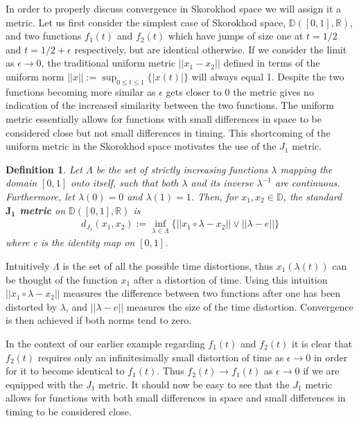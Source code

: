 \documentclass[honours,12pt]{unswthesis}
\newcommand{\R}{\mathbb{R}}
\newcommand{\1}{\mathbf 1}
\newcommand{\D}{\mathbb{D}}
\newtheorem{definition}[equation]{Definition}
\numberwithin{equation}{section}
\theoremstyle{definition}
\theoremstyle{remark}
\begin{document}
\noindent In order to properly discuss convergence in Skorokhod space we will assign it a metric. Let us first consider the simplest case of Skorokhod space, $\D([0,1],\R)$, and two functions $f_1(t)$ and $f_2(t)$ which have jumps of size one at $t=1/2$ and $t=1/2+\epsilon$ respectively, but are identical otherwise. If we consider the limit as $\epsilon\to0$, the traditional uniform metric $||x_1-x_2||$ defined in terms of the uniform norm $||x||:=\sup_{0\leq t\leq1}\{|x(t)|\}$ will always equal 1. Despite the two functions becoming more similar as $\epsilon$ gets closer to 0 the metric gives no indication of the increased similarity between the two functions. The uniform metric essentially allows for functions with small differences in space to be considered close but not small differences in timing. This shortcoming of the uniform metric in the Skorokhod space motivates the use of the $J_1$ metric.\\
\begin{definition}
	Let $\Lambda$ be the set of strictly increasing functions $\lambda$ mapping the domain $[0,1]$ onto itself, such that both $\lambda$ and its inverse $\lambda^{-1}$ are continuous. Furthermore, let $\lambda(0)=0$ and $\lambda(1)=1$. Then, for $x_1,x_2\in\D$, the standard \textbf{$\boldsymbol{J_1}$ metric} on $\D([0,1],\R)$ is 
	\begin{align*}
		d_{J_1}(x_1,x_2):=\inf_{\lambda \in \Lambda}\{||x_1 \circ \lambda -x_2||\vee||\lambda - e|| \}
	\end{align*}
	where e is the identity map on $[0,1]$.\\
\end{definition}
\noindent Intuitively $\Lambda$ is the set of all the possible time distortions, thus $x_1(\lambda(t))$ can be thought of the function $x_1$ after a distortion of time. Using this intuition $||x_1 \circ \lambda -x_2||$ measures the difference between two functions after one has been distorted by $\lambda$, and $||\lambda - e||$ measures the size of the time distortion. Convergence is then achieved if both norms tend to zero.

 In the context of our earlier example regarding $f_1(t)$ and $f_2(t)$ it is clear that $f_2(t)$ requires only an infinitesimally small distortion of time as $\epsilon\to0$ in order for it to become identical to $f_1(t)$. Thus $f_2(t)\to f_1(t)$ as $\epsilon\to0$ if we are equipped with the $J_1$ metric. It should now be easy to see that the $J_1$ metric allows for functions with both small differences in space and small differences in timing to be considered close.
\end{document}
